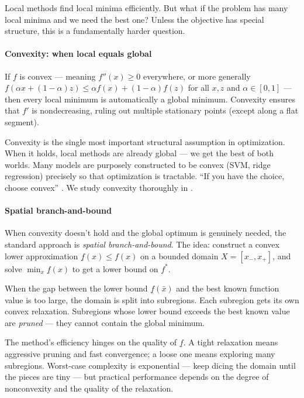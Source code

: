 Local methods find local minima efficiently.
But what if the problem has many local minima and we need the best one?
Unless the objective has special structure, this is a fundamentally harder question.

\paragraph{Convexity: when local equals global}

\begin{thm}\label{thm:convex-global}
	If $f$ is convex --- meaning $f''(x) \geq 0$ everywhere, or more generally $f(\alpha x + (1-\alpha)z) \leq \alpha f(x) + (1-\alpha) f(z)$ for all $x, z$ and $\alpha \in [0,1]$ --- then every local minimum is automatically a global minimum.
	Convexity ensures that $f'$ is nondecreasing, ruling out multiple stationary points (except along a flat segment).
\end{thm}

Convexity is the single most important structural assumption in optimization.
When it holds, local methods are already global --- we get the best of both worlds.
Many models are purposely constructed to be convex (SVM, ridge regression) precisely so that optimization is tractable.
``If you have the choice, choose convex'' \cite{boyd2008}.
We study convexity thoroughly in .

\paragraph{Spatial branch-and-bound}

When convexity doesn't hold and the global optimum is genuinely needed, the standard approach is \textit{spatial branch-and-bound}.
The idea: construct a convex lower approximation $\underline{f}(x) \leq f(x)$ on a bounded domain $X = [x_-, x_+]$, and solve $\min_x \underline{f}(x)$ to get a lower bound on $f^*$.

When the gap between the lower bound $\underline{f}(\bar{x})$ and the best known function value is too large, the domain is split into subregions.
Each subregion gets its own convex relaxation.
Subregions whose lower bound exceeds the best known value are \textit{pruned} --- they cannot contain the global minimum.

The method's efficiency hinges on the quality of $\underline{f}$.
A tight relaxation means aggressive pruning and fast convergence; a loose one means exploring many subregions.
Worst-case complexity is exponential --- keep dicing the domain until the pieces are tiny --- but practical performance depends on the degree of nonconvexity and the quality of the relaxation.

